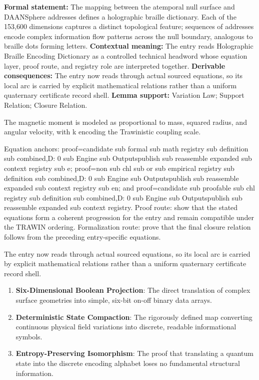 \begingroup\footnotesize\setlength{\emergencystretch}{3em}\sloppy
\textbf{Formal statement:} The mapping between the atemporal null surface and DAANSphere addresses defines a holographic braille dictionary. Each of the 153,600 dimensions captures a distinct topological feature; sequences of addresses encode complex information flow patterns across the null boundary, analogous to braille dots forming letters. \textbf{Contextual meaning:} The entry reads Holographic Braille Encoding Dictionary as a controlled technical headword whose equation layer, proof route, and registry role are interpreted together. \textbf{Derivable consequences:} The entry now reads through actual sourced equations, so its local arc is carried by explicit mathematical relations rather than a uniform quaternary certificate record shell. \textbf{Lemma support:} Variation Law; Support Relation; Closure Relation.\par
\endgroup

The magnetic moment is modeled as proportional to mass, squared radius, and angular velocity, with k encoding the Trawinistic coupling scale.

Equation anchors: proof=candidate sub formal sub math registry sub definition sub combined,D: 0 sub Engine sub Outputspublish sub reassemble expanded sub context registry sub e; proof=non sub chl sub or sub empirical registry sub definition sub combined,D: 0 sub Engine sub Outputspublish sub reassemble expanded sub context registry sub en; and proof=candidate sub proofable sub chl registry sub definition sub combined,D: 0 sub Engine sub Outputspublish sub reassemble expanded sub context registry. Proof route: show that the stated equations form a coherent progression for the entry and remain compatible under the TRAWIN ordering. Formalization route: prove that the final closure relation follows from the preceding entry-specific equations.

The entry now reads through actual sourced equations, so its local arc is carried by explicit mathematical relations rather than a uniform quaternary certificate record shell.
\endgroup

\begin{enumerate}[leftmargin=1.6em,itemsep=6pt,topsep=4pt]
\item \textbf{Six-Dimensional Boolean Projection}: The direct translation of complex surface geometries into simple, six-bit on-off binary data arrays.
\item \textbf{Deterministic State Compaction}: The rigorously defined map converting continuous physical field variations into discrete, readable informational symbols.
\item \textbf{Entropy-Preserving Isomorphism}: The proof that translating a quantum state into the discrete encoding alphabet loses no fundamental structural information.
\end{enumerate}


